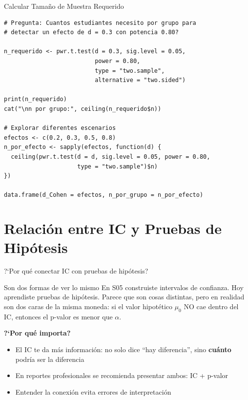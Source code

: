 \documentclass[aspectratio=169, 11pt]{beamer}
\begin{document}
\begin{frame}[fragile]{Calcular Tamaño de Muestra Requerido}
\begin{lstlisting}[basicstyle=\ttfamily\scriptsize]
# Pregunta: Cuantos estudiantes necesito por grupo para
# detectar un efecto de d = 0.3 con potencia 0.80?

n_requerido <- pwr.t.test(d = 0.3, sig.level = 0.05,
                          power = 0.80,
                          type = "two.sample",
                          alternative = "two.sided")

print(n_requerido)
cat("\nn por grupo:", ceiling(n_requerido$n))

# Explorar diferentes escenarios
efectos <- c(0.2, 0.3, 0.5, 0.8)
n_por_efecto <- sapply(efectos, function(d) {
  ceiling(pwr.t.test(d = d, sig.level = 0.05, power = 0.80,
                     type = "two.sample")$n)
})

data.frame(d_Cohen = efectos, n_por_grupo = n_por_efecto)
\end{lstlisting}
\end{frame}

\section{Relación entre IC y Pruebas de Hipótesis}

\begin{frame}{?`Por qu\'e conectar IC con pruebas de hip\'otesis?}
\small
\begin{exampleblock}{Son dos formas de ver lo mismo}
En S05 construiste intervalos de confianza. Hoy aprendiste pruebas de hip\'otesis. Parece que son cosas distintas, pero en realidad son \alert{dos caras de la misma moneda}: si el valor hipot\'etico $\mu_0$ NO cae dentro del IC, entonces el p-valor es menor que $\alpha$.
\end{exampleblock}

\vspace{0.2cm}
\textbf{?`Por qu\'e importa?}
\begin{itemize}\setlength{\itemsep}{1pt}
  \item El IC te da m\'as informaci\'on: no solo dice ``hay diferencia'', sino \textbf{cu\'anto} podr\'ia ser la diferencia
  \item En reportes profesionales se recomienda presentar \alert{ambos}: IC + p-valor
  \item Entender la conexi\'on evita errores de interpretaci\'on
\end{itemize}
\end{frame}
\end{document}
